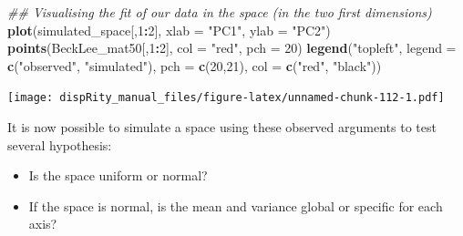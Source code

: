 \documentclass[]{book}
\newenvironment{Shaded}{\begin{snugshade}}{\end{snugshade}}
\newcommand{\CommentTok}[1]{\textcolor[rgb]{0.56,0.35,0.01}{\textit{#1}}}
\newcommand{\DataTypeTok}[1]{\textcolor[rgb]{0.13,0.29,0.53}{#1}}
\newcommand{\DecValTok}[1]{\textcolor[rgb]{0.00,0.00,0.81}{#1}}
\newcommand{\KeywordTok}[1]{\textcolor[rgb]{0.13,0.29,0.53}{\textbf{#1}}}
\newcommand{\NormalTok}[1]{#1}
\newcommand{\OperatorTok}[1]{\textcolor[rgb]{0.81,0.36,0.00}{\textbf{#1}}}
\newcommand{\StringTok}[1]{\textcolor[rgb]{0.31,0.60,0.02}{#1}}
\providecommand{\tightlist}{%
  \setlength{\itemsep}{0pt}\setlength{\parskip}{0pt}}
\begin{document}
\begin{Shaded}
\begin{Highlighting}[]
\CommentTok{## Visualising the fit of our data in the space (in the two first dimensions)}
\KeywordTok{plot}\NormalTok{(simulated_space[,}\DecValTok{1}\OperatorTok{:}\DecValTok{2}\NormalTok{], }\DataTypeTok{xlab =} \StringTok{"PC1"}\NormalTok{, }\DataTypeTok{ylab =} \StringTok{"PC2"}\NormalTok{)}
\KeywordTok{points}\NormalTok{(BeckLee_mat50[,}\DecValTok{1}\OperatorTok{:}\DecValTok{2}\NormalTok{], }\DataTypeTok{col =} \StringTok{"red"}\NormalTok{, }\DataTypeTok{pch =} \DecValTok{20}\NormalTok{)}
\KeywordTok{legend}\NormalTok{(}\StringTok{"topleft"}\NormalTok{, }\DataTypeTok{legend =} \KeywordTok{c}\NormalTok{(}\StringTok{"observed"}\NormalTok{, }\StringTok{"simulated"}\NormalTok{),}
        \DataTypeTok{pch =} \KeywordTok{c}\NormalTok{(}\DecValTok{20}\NormalTok{,}\DecValTok{21}\NormalTok{), }\DataTypeTok{col =} \KeywordTok{c}\NormalTok{(}\StringTok{"red"}\NormalTok{, }\StringTok{"black"}\NormalTok{))}
\end{Highlighting}
\end{Shaded}

\texttt{[image: dispRity\_manual\_files/figure-latex/unnamed-chunk-112-1.pdf]}

It is now possible to simulate a space using these observed arguments to test several hypothesis:

\begin{itemize}
\tightlist
\item
  Is the space uniform or normal?
\item
  If the space is normal, is the mean and variance global or specific for each axis?
\end{itemize}
\end{document}
